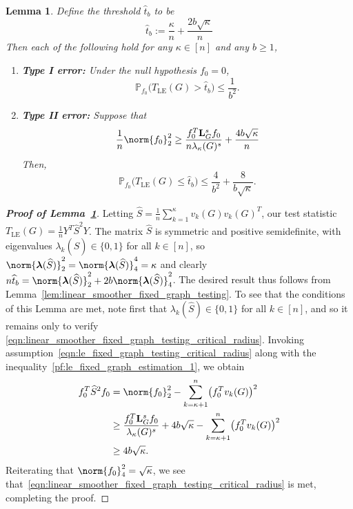 \documentclass{article}
\newcommand{\1}{\mathbf{1}}
\newcommand{\lambdavec}{\boldsymbol{\lambda}}
\newcommand{\Lap}{{\bf L}}
\newcommand{\Pbb}{\mathbb{P}}
\newcommand{\wh}[1]{\widehat{#1}}
\newcommand{\LE}{\mathrm{LE}}
\theoremstyle{alden}
\theoremstyle{aldenthm}
\newtheorem{lemma}{Lemma}
\theoremstyle{definition}
\theoremstyle{remark}
\begin{document}
\begin{lemma}
	\label{lem:le_fixed_graph_testing}
	Define the threshold $\wh{t}_b$ to be
	\begin{equation*}
	\wh{t}_b := \frac{\kappa}{n} + \frac{2b\sqrt{\kappa}}{n}
	\end{equation*}
	Then each of the following hold for any $\kappa \in [n]$ and any $b \geq 1$,
	\begin{enumerate}
		\item \textbf{Type I error:} Under the null hypothesis $f_0 = 0$,
		\begin{equation}
		\label{eqn:graph_spectral_type_I_error}
		\Pbb_{f_0}\biggl(T_{\LE}(G) > \wh{t}_b\biggr) \leq \frac{1}{b^2}.
		\end{equation}
		\item \textbf{Type II error:} Suppose that
		\begin{equation}
		\label{eqn:le_fixed_graph_testing_critical_radius}
		\frac{1}{n} \norm{f_0}_2^2 \geq \frac{f_0^T \Lap_G^s f_0}{n \lambda_{\kappa}(G)^s} + \frac{4b\sqrt{\kappa}}{n}
		\end{equation}
		Then,
		\begin{equation}
		\label{eqn:graph_spectral_type_II_error}
		\Pbb_{f_0}\biggl(T_{\LE}(G) \leq \wh{t}_b\biggr) \leq \frac{4}{b^2} + \frac{8}{b\sqrt{\kappa}}.
		\end{equation}
	\end{enumerate}
\end{lemma}
\begin{proof}[\textbf{Proof of Lemma~\ref{lem:le_fixed_graph_testing}}]
	Letting $\wh{S} = \frac{1}{n}\sum_{k = 1}^{\kappa} v_k(G) v_k(G)^T$, our test statistic $T_{\LE}(G) = \frac{1}{n} Y^T \wh{S}^2 Y$. The matrix $\wh{S}$ is symmetric and positive semidefinite, with eigenvalues $\lambda_k(\wh{S}) \in \{0,1\}$ for all $k \in [n]$, so $\norm{\lambdavec(\wh{S})}_2^2 = \norm{\lambdavec(\wh{S})}_4^4 = \kappa$ and clearly $n \wh{t}_b = \norm{\lambdavec(\wh{S})}_2^2 + 2b \norm{\lambdavec(\wh{S})}_4^2$.  The desired result thus follows from Lemma~\ref{lem:linear_smoother_fixed_graph_testing}. To see that the conditions of this Lemma are met, note first that $\lambda_k(\wh{S}) \in \{0,1\}$ for all $k \in [n]$, and so it remains only to verify \eqref{eqn:linear_smoother_fixed_graph_testing_critical_radius}. Invoking assumption~\eqref{eqn:le_fixed_graph_testing_critical_radius} along with the inequality~\eqref{pf:le_fixed_graph_estimation_1}, we obtain
	\begin{align*}
	f_0^T \wh{S}^2 f_0 & = \norm{f_0}_2^2 - \sum_{k = \kappa + 1}^{n} \bigl(f_0^T v_k(G)\bigr)^2 \\
	& \geq \frac{f_0^T \Lap_G^s f_0}{\lambda_{\kappa}(G)^s} + 4b\sqrt{\kappa} - \sum_{k = \kappa + 1}^{n} \bigl(f_0^T v_k(G)\bigr)^2 \\
	& \geq 4b\sqrt{\kappa}.
	\end{align*}
	Reiterating that $\norm{f_0}_4^2 = \sqrt{\kappa}$, we see that~\eqref{eqn:linear_smoother_fixed_graph_testing_critical_radius} is met, completing the proof.
\end{proof}
\end{document}
